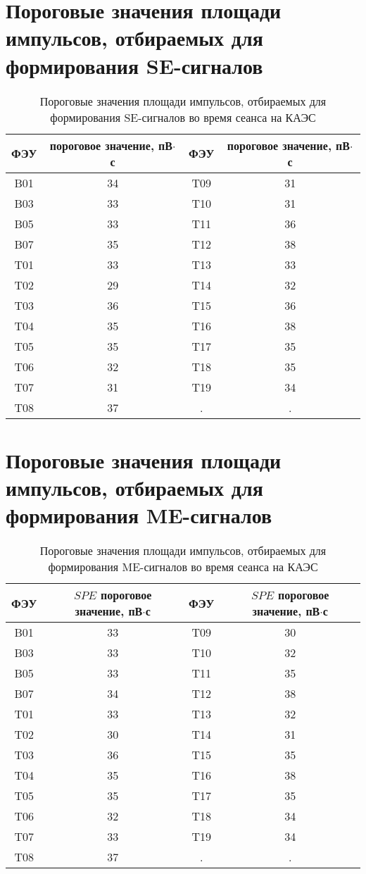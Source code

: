 \section{Пороговые значения площади импульсов, отбираемых для формирования SE-сигналов} 
\label{AppendixA2}
\begin{table}[H]
    \centering
    \caption{Пороговые значения площади импульсов, отбираемых для формирования SE-сигналов во время сеанса на КАЭС}
\begin{tabular}{|c|c|c|c|}
\hline ФЭУ & пороговое значение, пВ$\cdot$с & ФЭУ & пороговое значение, пВ$\cdot$с \\
\hline B01 & 34 & T09 & 31 \\
\hline B03 & 33 & T10 & 31 \\
\hline B05 & 33 & T11 & 36 \\
\hline B07 & 35 & T12 & 38 \\
\hline T01 & 33 & T13 & 33 \\
\hline T02 & 29 & T14 & 32 \\
\hline T03 & 36 & T15 & 36 \\
\hline T04 & 35 & T16 & 38 \\
\hline T05 & 35 & T17 & 35 \\
\hline T06 & 32 & T18 & 35 \\
\hline T07 & 31 & T19 & 34 \\
\hline T08 & 37 & . & . \\
\hline
\end{tabular}
\label{spethresholds2022}
\end{table}

\section{Пороговые значения площади импульсов, отбираемых для формирования ME-сигналов} 
\label{AppendixA3}
\begin{table}[H]
    \centering
    \caption{Пороговые значения площади импульсов, отбираемых для формирования ME-сигналов во время сеанса на КАЭС}
\begin{tabular}{|c|c|c|c|}
\hline ФЭУ & $S P E$ пороговое значение, пВ$\cdot$с & ФЭУ & $S P E$ пороговое значение, пВ$\cdot$с \\
\hline B01 & 33 & T09 & 30 \\
\hline B03 & 33 & T10 & 32 \\
\hline B05 & 33 & T11 & 35 \\
\hline B07 & 34 & T12 & 38 \\
\hline T01 & 33 & T13 & 32 \\
\hline T02 & 30 & T14 & 31 \\
\hline T03 & 36 & T15 & 35 \\
\hline T04 & 35 & T16 & 38 \\
\hline T05 & 35 & T17 & 35 \\
\hline T06 & 32 & T18 & 34 \\
\hline T07 & 33 & T19 & 34 \\
\hline T08 & 37 & . & . \\
\hline
\end{tabular}
\label{spethresholds2022me}
\end{table}